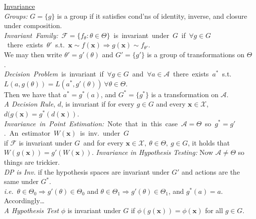 \documentclass[11pt]{article}
\newcommand{\vecx}{\ensuremath{\mathbf{x}}}
\newcommand{\sam}{\ensuremath{\mathcal{X}}} %
\newcommand{\act}{\ensuremath{\mathcal{A}}} %
\begin{document}
\indent\underline{Invariance}\\
{\it Groups:} $G=\{g\}$ is a group if it satisfies cond'ns of identity, inverse, and closure under
composition.\\
%
\mbox{{\it Invariant Family:} $\mathcal{F}=\{f_\theta : \theta\in\Theta\}$ is invariant under $G$
if $\forall g\in G$ there exists $\theta '$ s.t.\ $\vecx\sim f(\vecx)\Longrightarrow g(\vecx)\sim
f_{\theta '}$.}\\
\hspace*{1.5em} We may then write $\theta ' = g'(\theta)$ and $G'=\{g'\}$ is a group of
transformations on $\Theta$.\\
%
\mbox{{\it Decision Problem} is invariant if $\forall g\in G$ and $\forall a\in\mathcal{A}$ there
exists $a^*$ s.t. $L(a,g(\theta)) = L(a^*,g'(\theta))\ \forall \theta\in\Theta$.}\\
\hspace*{1.5em} Then we have that $a^*=g^*(a)$, and $G^*=\{g^*\}$ is a transformation on
$\mathcal{A}$.\\
%
{\it A Decision Rule}, $d$, is invariant if for every $g\in G$ and every $\vecx\in \mathcal{X}$,
$d(g(\vecx) = g^*(d(\vecx))$.\\
%
\mbox{{\it Invariance in Point Estimation:} Note that in this case $\act = \Theta$ so $g^* = g'$.  An
estimator $W(\vecx)$ is inv.\ under $G$}\\
\hspace*{1.5em} if $\mathcal{F}$ is invariant under $G$\ and for every $\vecx\in\sam,\
\theta\in\Theta,\ g\in G$, it holds that $W(g(\vecx)) = g'(W(\vecx))$.
%
{\it Invariance in Hypothesis Testing:}  Now $\act \neq \Theta$ so things are trickier.\\
\hspace*{1.5em}\textsl{DP is Inv.} if the hypothesis spaces are invariant under $G'$ and actions are
the same under $G^*$.\\
\hspace*{1.5em}\textsl{i.e.}\ $\theta\in\Theta_0 \Longrightarrow g'(\theta)\in\Theta_0$ and
$\theta\in\Theta_1 \Longrightarrow g'(\theta)\in\Theta_1$, and $g^*(a) = a$.   \hspace{1.5em}
Accordingly\ldots\\
\hspace*{1.5em}\textsl{A Hypothesis Test} $\phi$ is invariant under $G$ if
$\phi(g(\vecx))=\phi(\vecx)$ for all $g\in G$.
\end{document}
